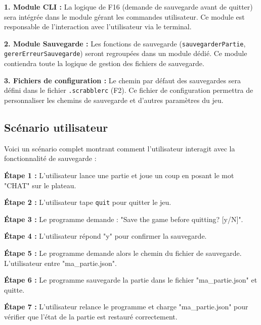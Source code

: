 \documentclass[a4paper]{article}
\begin{document}
\vspace{1\baselineskip}
\hangindent=1.5cm
\textbf{1. Module CLI :} La logique de F16 (demande de sauvegarde avant de quitter) sera intégrée dans le module gérant les commandes utilisateur. Ce module est responsable de l'interaction avec l'utilisateur via le terminal.

\vspace{1\baselineskip}
\hangindent=1.5cm
\textbf{2. Module Sauvegarde :} Les fonctions de sauvegarde (\texttt{sauvegarderPartie}, \texttt{gererErreurSauvegarde}) seront regroupées dans un module dédié. Ce module contiendra toute la logique de gestion des fichiers de sauvegarde.

\vspace{1\baselineskip}
\hangindent=1.5cm
\textbf{3. Fichiers de configuration :} Le chemin par défaut des sauvegardes sera défini dans le fichier \texttt{.scrabblerc} (F2). Ce fichier de configuration permettra de personnaliser les chemins de sauvegarde et d'autres paramètres du jeu.

\vspace{1\baselineskip}


\subsection{Scénario utilisateur}
\hangindent=0.8mm
Voici un scénario complet montrant comment l'utilisateur interagit avec la fonctionnalité de sauvegarde :

\hangindent=1.5cm
\textbf{Étape 1 :} L'utilisateur lance une partie et joue un coup en posant le mot "CHAT" sur le plateau.

\hangindent=1.5cm
\textbf{Étape 2 :} L'utilisateur tape \texttt{quit} pour quitter le jeu.

\hangindent=1.5cm
\textbf{Étape 3 :} Le programme demande : "Save the game before quitting? [y/N]".

\hangindent=1.5cm
\textbf{Étape 4 :} L'utilisateur répond "y" pour confirmer la sauvegarde.

\hangindent=1.5cm
\textbf{Étape 5 :} Le programme demande alors le chemin du fichier de sauvegarde. L'utilisateur entre "ma\_partie.json".

\hangindent=1.5cm
\textbf{Étape 6 :} Le programme sauvegarde la partie dans le fichier "ma\_partie.json" et quitte.

\hangindent=1.5cm
\textbf{Étape 7 :} L'utilisateur relance le programme et charge "ma\_partie.json" pour vérifier que l'état de la partie est restauré correctement.
\end{document}
